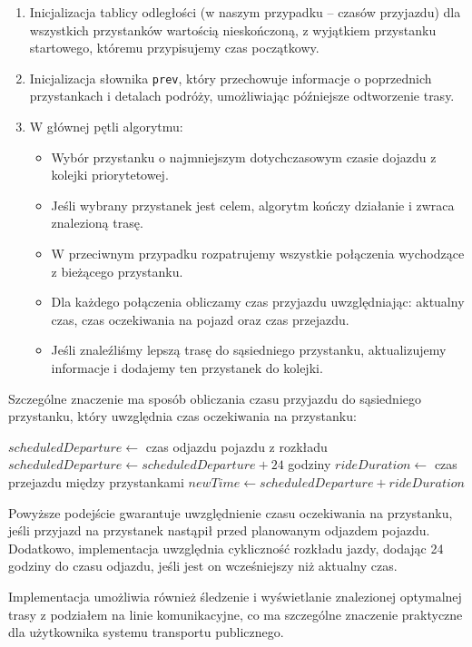 \documentclass[12pt,a4paper]{article}
\begin{document}
\begin{enumerate}
    \item Inicjalizacja tablicy odległości (w naszym przypadku -- czasów przyjazdu) dla wszystkich przystanków wartością nieskończoną, z wyjątkiem przystanku startowego, któremu przypisujemy czas początkowy.
    \item Inicjalizacja słownika \texttt{prev}, który przechowuje informacje o poprzednich przystankach i detalach podróży, umożliwiając późniejsze odtworzenie trasy.
    \item W głównej pętli algorytmu:
    \begin{itemize}
        \item Wybór przystanku o najmniejszym dotychczasowym czasie dojazdu z kolejki priorytetowej.
        \item Jeśli wybrany przystanek jest celem, algorytm kończy działanie i zwraca znalezioną trasę.
        \item W przeciwnym przypadku rozpatrujemy wszystkie połączenia wychodzące z bieżącego przystanku.
        \item Dla każdego połączenia obliczamy czas przyjazdu uwzględniając: aktualny czas, czas oczekiwania na pojazd oraz czas przejazdu.
        \item Jeśli znaleźliśmy lepszą trasę do sąsiedniego przystanku, aktualizujemy informacje i dodajemy ten przystanek do kolejki.
    \end{itemize}
\end{enumerate}

Szczególne znaczenie ma sposób obliczania czasu przyjazdu do sąsiedniego przystanku, który uwzględnia czas oczekiwania na przystanku:

\begin{algorithmic}
\STATE $scheduledDeparture \gets$ czas odjazdu pojazdu z rozkładu
    \STATE $scheduledDeparture \gets scheduledDeparture + 24$ godziny
\ENDIF
\STATE $rideDuration \gets$ czas przejazdu między przystankami
\STATE $newTime \gets scheduledDeparture + rideDuration$
\end{algorithmic}

Powyższe podejście gwarantuje uwzględnienie czasu oczekiwania na przystanku, jeśli przyjazd na przystanek nastąpił przed planowanym odjazdem pojazdu. Dodatkowo, implementacja uwzględnia cykliczność rozkładu jazdy, dodając 24 godziny do czasu odjazdu, jeśli jest on wcześniejszy niż aktualny czas.

Implementacja umożliwia również śledzenie i wyświetlanie znalezionej optymalnej trasy z podziałem na linie komunikacyjne, co ma szczególne znaczenie praktyczne dla użytkownika systemu transportu publicznego.
\end{document}
